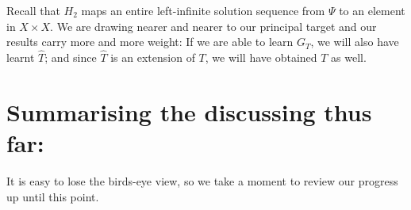 Recall that $H_2$ maps an entire left-infinite solution sequence from $\Psi$ to an element in $X\times{X}$. 
We are drawing nearer and nearer to our principal target and our results carry more and more weight: If we are able to learn $G_T$, we will also have learnt $\widehat{T}$; and since $\widehat{T}$ is an extension of $T$, we will have obtained $T$ as well.  %



 



\section*{Summarising the discussing thus far:}

It is easy to lose the birds-eye view, so we take a moment to review our progress up until this point.

